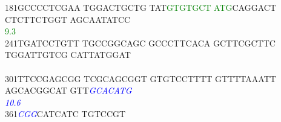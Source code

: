 \documentclass[11pt,twoside,reqno,a4paper]{article}
\begin{document}
{181\hspace*{1\charwidth}GCCCCTCGAA	TGGACTGCTG	TAT\textcolor{Green}{G}\textcolor{Green}{T}\textcolor{Green}{G}\textcolor{Green}{T}\textcolor{Green}{G}\textcolor{Green}{C}\textcolor{Green}{T}	\textcolor{Green}{A}\textcolor{Green}{T}\textcolor{Green}{G}CAGGACT	CTCTTCTGGT	AGCAATATCC	\\
\hspace*{4\charwidth}\hspace*{1\charwidth}\hspace*{1\charwidth}\hspace*{23\charwidth}\textcolor{Green}{9.3}\hspace*{1\charwidth}\hspace*{1\charwidth}\hspace*{1\charwidth}\hspace*{1\charwidth}\\
241\hspace*{1\charwidth}TGATCCTGTT	TGCCGGCAGC	GCCCTTCACA	GCTTCGCTTC	TGGATTGTCG	CATTATGGAT	\\
\hspace*{4\charwidth}\hspace*{1\charwidth}\hspace*{1\charwidth}\hspace*{1\charwidth}\hspace*{1\charwidth}\hspace*{1\charwidth}\hspace*{1\charwidth}\\
301\hspace*{1\charwidth}TTCCGAGCGG	TCGCAGCGGT	GTGTCCTTTT	GTTTTAAATT	AGCACGGCAT	GTT\textit{\textcolor{Blue}{G}}\textit{\textcolor{Blue}{C}}\textit{\textcolor{Blue}{A}}\textit{\textcolor{Blue}{C}}\textit{\textcolor{Blue}{A}}\textit{\textcolor{Blue}{T}}\textit{\textcolor{Blue}{G}}	\\
\hspace*{4\charwidth}\hspace*{1\charwidth}\hspace*{1\charwidth}\hspace*{1\charwidth}\hspace*{1\charwidth}\hspace*{1\charwidth}\hspace*{53\charwidth}\textit{\textcolor{Blue}{10.6}}\hspace*{1\charwidth}\\
361\hspace*{1\charwidth}\textit{\textcolor{Blue}{C}}\textit{\textcolor{Blue}{G}}\textit{\textcolor{Blue}{G}}CATCATC	TGTCCGT\\
\hspace*{4\charwidth}\hspace*{1\charwidth}\\
}
\end{document}
